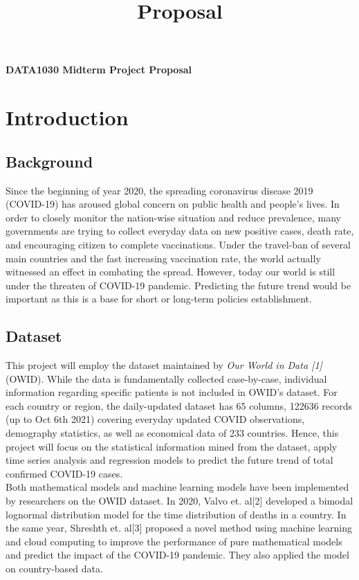 \documentclass[12pt]{article}
\title{Proposal}
\begin{document}

\begin{center}
	{\LARGE \bf DATA1030 Midterm Project Proposal}\\
	\vspace{0.3cm}{Nange Li, Oct. 11th 2021}
\end{center}

\section{Introduction}
\subsection{Background}
Since the beginning of year 2020, the spreading coronavirus  disease 2019 (COVID-19) has aroused global concern on public health and people's lives. In order to closely monitor the nation-wise situation and reduce prevalence, many governments are trying to collect everyday data on new positive cases, death rate, and encouraging citizen to complete vaccinations. Under the travel-ban of several main countries and the fast increasing vaccination rate, the world actually witnessed an effect in combating the  spread. However, today our world is still under the threaten of COVID-19 pandemic. Predicting the future trend would be important as this is a base for short or long-term policies establishment.
\subsection{Dataset}
This project will employ the dataset maintained by {\em Our World in Data [1]} (OWID). While the data is fundamentally collected case-by-case, individual information regarding specific patients is not included in OWID's dataset. For each country or region, the daily-updated dataset has 65 columns, 122636 records (up to Oct 6th 2021) covering everyday updated COVID observations, demography statistics, as well as economical data of 233 countries.  Hence, this project will focus on the statistical information mined from the dataset, apply time series analysis and regression models to predict the future trend of total confirmed COVID-19 cases. \\

Both mathematical models and machine learning models have been implemented by researchers on the OWID dataset. In 2020, Valvo et. al[2] developed a bimodal lognormal distribution model for the time distribution of deaths in a country. In the same year, Shreshth et. al[3] proposed a novel method using machine learning and cloud computing to improve the performance of pure mathematical models and predict the impact of the COVID-19 pandemic. They also applied the model on country-based data. 
\end{document}
